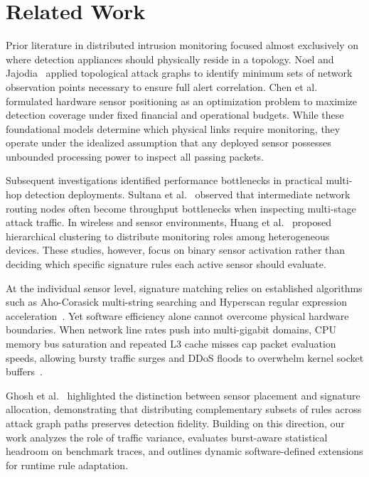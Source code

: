 \documentclass[conference]{IEEEtran}
\begin{document}
\section{Related Work}
\label{sec:related}

Prior literature in distributed intrusion monitoring focused almost exclusively on where detection appliances should physically reside in a topology. Noel and Jajodia~\cite{noel2008optimal} applied topological attack graphs to identify minimum sets of network observation points necessary to ensure full alert correlation. Chen et al.~\cite{chen2010optimising} formulated hardware sensor positioning as an optimization problem to maximize detection coverage under fixed financial and operational budgets. While these foundational models determine which physical links require monitoring, they operate under the idealized assumption that any deployed sensor possesses unbounded processing power to inspect all passing packets.

Subsequent investigations identified performance bottlenecks in practical multi-hop detection deployments. Sultana et al.~\cite{sultana2021importance} observed that intermediate network routing nodes often become throughput bottlenecks when inspecting multi-stage attack traffic. In wireless and sensor environments, Huang et al.~\cite{huang2022efficient} proposed hierarchical clustering to distribute monitoring roles among heterogeneous devices. These studies, however, focus on binary sensor activation rather than deciding which specific signature rules each active sensor should evaluate.

At the individual sensor level, signature matching relies on established algorithms such as Aho-Corasick multi-string searching and Hyperscan regular expression acceleration~\cite{roesch1999snort}. Yet software efficiency alone cannot overcome physical hardware boundaries. When network line rates push into multi-gigabit domains, CPU memory bus saturation and repeated L3 cache misses cap packet evaluation speeds, allowing bursty traffic surges and DDoS floods to overwhelm kernel socket buffers~\cite{garcia2009anomaly, albanese2018defending}.

Ghosh et al.~\cite{ghosh2024improving, ghosh2026optimizing} highlighted the distinction between sensor placement and signature allocation, demonstrating that distributing complementary subsets of rules across attack graph paths preserves detection fidelity. Building on this direction, our work analyzes the role of traffic variance, evaluates burst-aware statistical headroom on benchmark traces, and outlines dynamic software-defined extensions for runtime rule adaptation.
\end{document}
